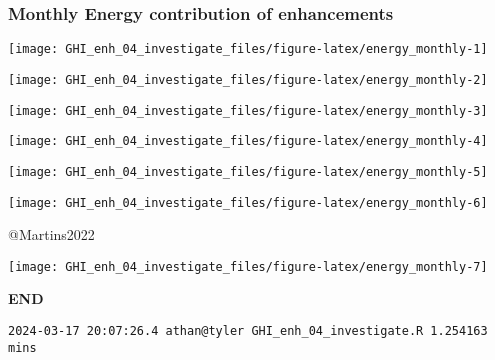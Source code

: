 \documentclass[
  10pt,
  a4paper,oneside]{article}
\begin{document}
\newpage
\FloatBarrier

\hypertarget{monthly-energy-contribution-of-enhancements}{%
\subsubsection{Monthly Energy contribution of enhancements}\label{monthly-energy-contribution-of-enhancements}}

\begin{center}\texttt{[image: GHI\_enh\_04\_investigate\_files/figure-latex/energy\_monthly-1]} \end{center}

\begin{center}\texttt{[image: GHI\_enh\_04\_investigate\_files/figure-latex/energy\_monthly-2]} \end{center}

\begin{center}\texttt{[image: GHI\_enh\_04\_investigate\_files/figure-latex/energy\_monthly-3]} \end{center}

\begin{center}\texttt{[image: GHI\_enh\_04\_investigate\_files/figure-latex/energy\_monthly-4]} \end{center}

\begin{center}\texttt{[image: GHI\_enh\_04\_investigate\_files/figure-latex/energy\_monthly-5]} \end{center}

\begin{center}\texttt{[image: GHI\_enh\_04\_investigate\_files/figure-latex/energy\_monthly-6]} \end{center}

@Martins2022

\begin{center}\texttt{[image: GHI\_enh\_04\_investigate\_files/figure-latex/energy\_monthly-7]} \end{center}

\textbf{END}

\begin{verbatim}
2024-03-17 20:07:26.4 athan@tyler GHI_enh_04_investigate.R 1.254163 mins
\end{verbatim}
\end{document}
